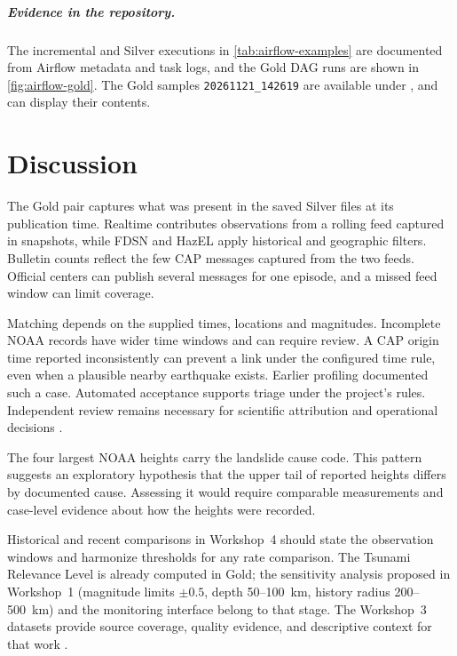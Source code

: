 \documentclass[a4paper,11pt,oneside]{book}
\newcommand{\goldstamp}{\texttt{20261121\_142619}}
\newcommand{\indicatorstamp}{\goldstamp}
\begin{document}
\paragraph{Evidence in the repository.}
The incremental and Silver executions in \cref{tab:airflow-examples} are documented from Airflow metadata and task logs, and the Gold DAG runs are shown in \cref{fig:airflow-gold}. The Gold samples \indicatorstamp{} are available under , and  can display their contents.

\chapter{Discussion}
The Gold pair captures what was present in the saved Silver files at its publication time. Realtime contributes observations from a rolling feed captured in snapshots, while FDSN and HazEL apply historical and geographic filters. Bulletin counts reflect the few CAP messages captured from the two feeds. Official centers can publish several messages for one episode, and a missed feed window can limit coverage.

Matching depends on the supplied times, locations and magnitudes. Incomplete NOAA records have wider time windows and can require review. A CAP origin time reported inconsistently can prevent a link under the configured time rule, even when a plausible nearby earthquake exists. Earlier profiling documented such a case. Automated acceptance supports triage under the project's rules. Independent review remains necessary for scientific attribution and operational decisions \cite{workshop1,teamassignment}.

The four largest NOAA heights carry the landslide cause code. This pattern suggests an exploratory hypothesis that the upper tail of reported heights differs by documented cause. Assessing it would require comparable measurements and case-level evidence about how the heights were recorded.

Historical and recent comparisons in Workshop~4 should state the observation windows and harmonize thresholds for any rate comparison. The Tsunami Relevance Level is already computed in Gold; the sensitivity analysis proposed in Workshop~1 (magnitude limits $\pm0.5$, depth 50--100~km, history radius 200--500~km) and the monitoring interface belong to that stage. The Workshop~3 datasets provide source coverage, quality evidence, and descriptive context for that work \cite{courseproject}.
\end{document}

